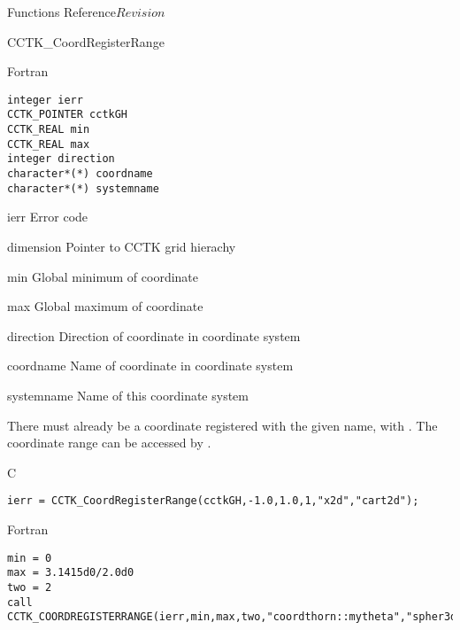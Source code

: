 \begin{cactuspart}{ Functions Reference}{}{$Revision$}
\begin{FunctionDescription}{CCTK\_CoordRegisterRange}
\begin{SynopsisSection}
\begin{Synopsis}{Fortran}
\begin{verbatim}
integer ierr
CCTK_POINTER cctkGH
CCTK_REAL min
CCTK_REAL max
integer direction
character*(*) coordname
character*(*) systemname \end{verbatim}
\end{Synopsis}
\end{SynopsisSection}
\begin{ParameterSection}
\begin{Parameter}{ierr}
Error code
\end{Parameter}
\begin{Parameter}{dimension}
Pointer to CCTK grid hierachy
\end{Parameter}
\begin{Parameter}{min}
Global minimum of coordinate
\end{Parameter}
\begin{Parameter}{max}
Global maximum of coordinate
\end{Parameter}
\begin{Parameter}{direction}
Direction of coordinate in coordinate system
\end{Parameter}
\begin{Parameter}{coordname}
Name of coordinate in coordinate system
\end{Parameter}
\begin{Parameter}{systemname}
Name of this coordinate system
\end{Parameter}
\end{ParameterSection}
\begin{Discussion}
There must already
be a coordinate registered with the given name, with
.
The coordinate range
can be accessed by .
\end{Discussion}
\begin{ExampleSection}
\begin{Example}{C}
\begin{verbatim}
ierr = CCTK_CoordRegisterRange(cctkGH,-1.0,1.0,1,"x2d","cart2d");
\end{verbatim}
\end{Example}
\begin{Example}{Fortran}
\begin{verbatim}
min = 0
max = 3.1415d0/2.0d0
two = 2
call CCTK_COORDREGISTERRANGE(ierr,min,max,two,"coordthorn::mytheta","spher3d")
\end{verbatim}
\end{Example}
\end{ExampleSection}
\end{FunctionDescription}


\end{cactuspart}
